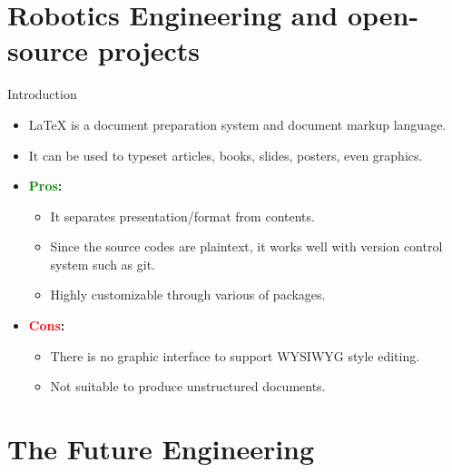 \documentclass[xcolor={dvipsnames},aspectratio=169,10pt]{beamer}
\begin{document}
\section{Robotics Engineering and open-source projects}

\begin{frame}{Introduction}
  \begin{itemize}
    \item \alert{\LaTeX{}} is a document preparation system and document markup language.
    \item It can be used to typeset articles, books, slides, posters, even graphics.
    \item \textbf{\textcolor{Green}{Pros}:}
          \begin{itemize}
            \item It separates presentation/format from contents.
            \item Since the source codes are plaintext, it works well with version control system such as git.
            \item Highly customizable through various of packages.
          \end{itemize}
    \item \textbf{\textcolor{Red}{Cons}:}
          \begin{itemize}
            \item There is no graphic interface to support WYSIWYG style editing.
            \item Not suitable to produce unstructured documents.
          \end{itemize}
  \end{itemize}
\end{frame}




\section{The Future Engineering }
\end{document}

